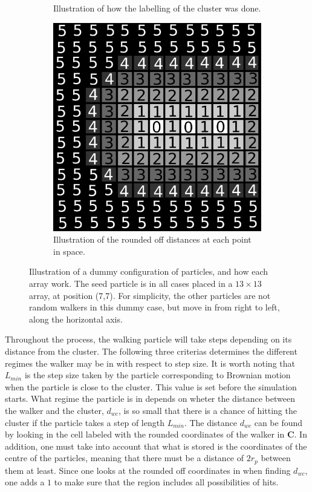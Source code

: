\begin{figure}[h]
\begin{center}
\begin{subfigure}[t]{0.3\textwidth}
			\caption{Illustration of how the labelling of the cluster was done. }
			\label{fig:B_array}
		\end{subfigure}
		\begin{subfigure}[t]{0.3\textwidth}
			\includegraphics[width = \textwidth]{fig/C_array.png}
			\caption{Illustration of the rounded off distances at each point in space.  }
			\label{fig:C_array}
		\end{subfigure}
		\caption{Illustration of a dummy configuration of particles, and how each array work. The seed particle is in all cases placed in a $13 \times 13$ array, at position (7,7). For simplicity, the other particles are not random walkers in this dummy case, but move in from right to left, along the horizontal axis.}
		\label{fig:arrays}
	\end{center}
\end{figure}

Throughout the process, the walking particle will take steps depending on its distance from the cluster. The following three criterias determines the different regimes the walker may be in with respect to step size. It is worth noting that $L_{min}$ is the step size taken by the particle corresponding to Brownian motion when the particle is close to the cluster. This value is set before the simulation starts. What regime the particle is in depends on wheter the distance between the walker and the cluster, $d_{wc}$, is so small that there is a chance of hitting the cluster if the particle takes a step of length $L_{min}$. The distance $d_{wc}$ can be found by looking in the cell labeled with the rounded coordinates of the walker in $\textbf{C}$. In addition, one must take into account that what is stored is the coordinates of the centre of the particles, meaning that there must be a distance of $2r_p$ between them at least. Since one looks at the rounded off coordinates in when finding $d_{wc}$, one adds a $1$ to make sure that the region includes all possibilities of hits.


